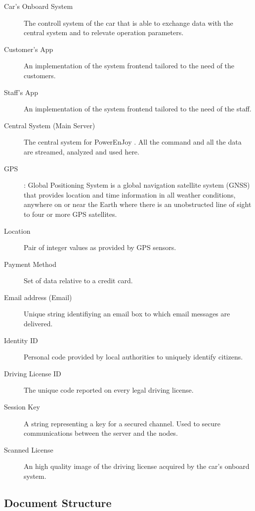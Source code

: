 \documentclass[11pt]{article} %
\newcommand{\pe}{PowerEnJoy }
\begin{document}
\begin{description}
	\item[Car's Onboard System] The controll system of the car that is able to exchange data with the central system and to relevate operation parameters.
	\item[Customer's App] An implementation of the system frontend tailored to the need of the customers.
	\item[Staff's App] An implementation of the system frontend tailored to the need of the staff.
	\item[Central System (Main Server)] The central system for \pe. All the command and all the data are streamed, analyzed and used here.
	\item[GPS]: Global Positioning System is a global navigation satellite system (GNSS) that provides location and time information in all weather conditions, anywhere on or near the Earth where there is an unobstructed line of sight to four or more GPS satellites.
	\item[Location] Pair of integer values as provided by GPS sensors.
	\item[Payment Method] Set of data relative to a credit card.
	\item[Email address (Email)] Unique string identifiying an email box to which email messages are delivered.
	\item[Identity ID] Personal code provided by local authorities to uniquely identify citizens.
	\item[Driving License ID] The unique code reported on every legal driving license.
	\item[Session Key]  A string representing a key for a secured channel. Used to secure communications between the server and the nodes.
	\item[Scanned License] An high quality image of the driving license acquired by the car's onboard system.
  \end{description}

\subsection{Document Structure}
\end{document}
